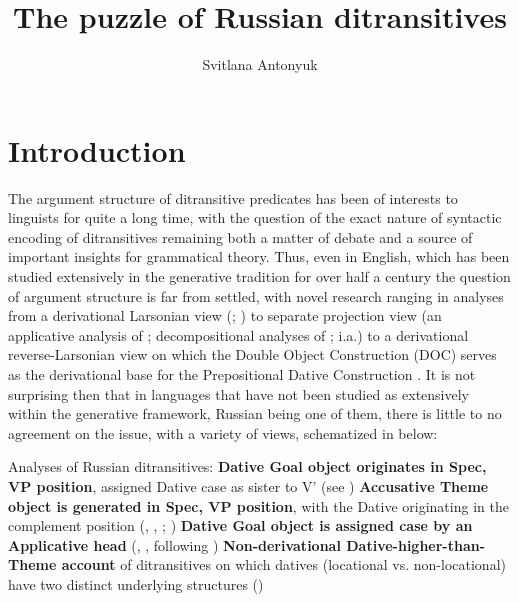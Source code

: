 \documentclass[output=paper,colorlinks,citecolor=brown,nonflat]{./langscibook}
\author{Svitlana Antonyuk	\affiliation{University of Connecticut}}
\title{The puzzle of Russian ditransitives}
\begin{document}
\maketitle
 




\section{Introduction}\label{sec:antonyuk:1}

The argument structure of ditransitive predicates has been of interests to linguists for quite a long time, with the question of the exact nature of syntactic encoding of ditransitives remaining both a matter of debate and a source of important insights for grammatical theory. Thus, even in English, which has been studied extensively in the generative tradition for over half a century the question of argument structure is far from settled, with novel research ranging in analyses from a derivational Larsonian view (\citealt{Larson1988}; \citeyear{Larson2014}) to separate projection view (an applicative analysis of \citealt{Marantz1993}; decompositional analyses of \citealt{Pesetsky1995, Harley1995Diss}; \citeyear{Harley2002} i.a.) to a derivational reverse-Larsonian view on which the Double Object Construction (DOC) serves as the derivational base for the Prepositional Dative Construction \citep{Hallman2015}. It is not surprising then that in languages that have not been studied as extensively within the generative framework, Russian being one of them, there is little to no agreement on the issue, with a variety of views, schematized in  below:

\ea%
    \label{ex:antonyuk:1}
    Analyses of Russian ditransitives:
    \ea \textbf{Dative Goal object originates in Spec, VP position}, assigned Dative case as sister to V’ (see \citealt{HarbertToribio1991, GreenbergFranks1991, Franks1995, Richardson2007})
    \ex \textbf{Accusative Theme object is generated in Spec, VP position}, with the Dative originating in the complement position (\citealt{Bailyn1995}, \citeyear{Bailyn2010}, \citeyear{Bailyn2012}; \citealt{Titov2017})
    \ex \textbf{Dative Goal object is assigned case by an Applicative head} (\citealt{Dyakonova2005}, \citeyear{Dyakonova2009}, following \citealt{Pylkkänen2002})
    \ex \textbf{Non-derivational Dative-higher-than-Theme account} of ditransitives on which datives (locational vs. non-locational) have two distinct underlying structures (\citealt{BonehNash2017})
    \z
\z
\end{document}

